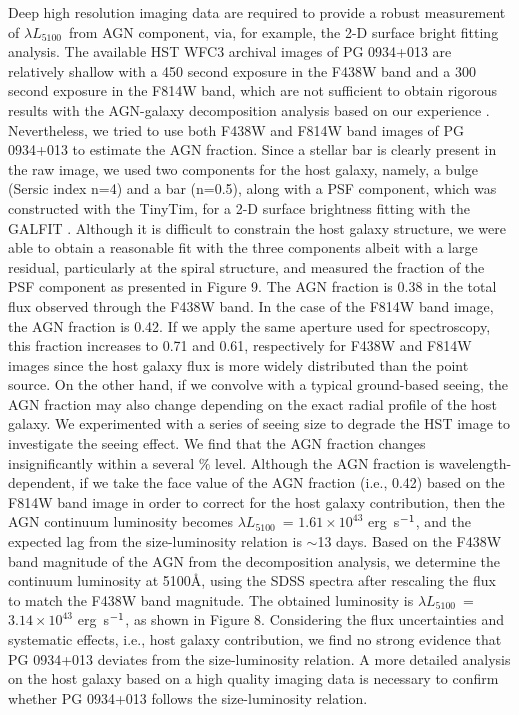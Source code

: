 \documentclass[iop]{emulateapj}
\newcommand{\ergs}{erg~s$^{\rm -1}$}
\newcommand{\lf}{\ensuremath{L_{5100}}}
\begin{document}
Deep high resolution imaging data are required to provide a robust measurement of $\lambda$\lf\ from AGN component, via, for example, the 2-D surface bright fitting analysis. The available HST WFC3 archival images of PG 0934+013 are relatively shallow with a 450 second exposure in the F438W band and a 300 second exposure in the F814W band, which are not sufficient to obtain rigorous results with the AGN-galaxy decomposition analysis based on our experience \citep{Bennert2010,Park2015}. Nevertheless, we tried to use both F438W and F814W band images of PG 0934+013 to estimate the AGN fraction. Since a stellar bar is clearly present in the raw image, we used two components for the host galaxy, namely, a bulge (Sersic index n=4) and a bar (n=0.5), along with a PSF component, which was constructed with the TinyTim, for a 2-D surface brightness fitting with the GALFIT \citep{Peng02}. Although it is difficult to constrain the host galaxy structure, we were able to obtain a reasonable fit with the three components albeit with a large residual, particularly at the spiral structure, and measured the fraction of the PSF component as presented in Figure 9.
The AGN fraction is 0.38 in the total flux observed through the F438W band. In the case of the F814W band image, the AGN fraction is 0.42. If we apply the same aperture used for spectroscopy, this fraction increases to 0.71 and 0.61, respectively for F438W and F814W images since the host galaxy flux is more widely distributed than the point source. 
On the other hand, if we convolve with a typical ground-based seeing, the AGN fraction may also change depending on the exact radial profile of the host galaxy.  We experimented with a series of seeing size to degrade the HST image to investigate the seeing effect. We find that the AGN fraction
changes insignificantly within a several $\%$ level. 
Although the AGN fraction is wavelength-dependent, if we take the face value of the AGN fraction (i.e., 0.42) based on the F814W band image in order to correct for the host galaxy contribution, then the AGN continuum luminosity becomes $\lambda$\lf\ = $1.61 \times 10^{43}$ \ergs, and the expected lag from the size-luminosity relation is $\sim$13 days. Based on the F438W band magnitude of the AGN from the decomposition analysis, we determine the continuum luminosity at 5100\AA, using the SDSS spectra after rescaling the flux to match the F438W band magnitude. The obtained luminosity is $\lambda$\lf\  = $3.14 \times 10^{43}$ \ergs, as shown in Figure 8. 
Considering the flux uncertainties and systematic effects, i.e., host galaxy contribution, we find no strong evidence that PG 0934+013 deviates from the size-luminosity relation.
A more detailed analysis on the host galaxy
based on a high quality imaging data is necessary to confirm whether PG 0934+013 follows the size-luminosity relation.
\end{document}
